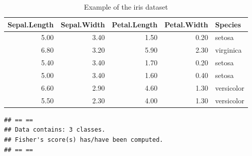 \documentclass[a4paper,conference]{IEEEtran}
\newenvironment{Shaded}{\begin{snugshade}}{\end{snugshade}}
\newcommand{\DecValTok}[1]{\textcolor[rgb]{0.00,0.00,0.81}{#1}}
\newcommand{\FunctionTok}[1]{\textcolor[rgb]{0.13,0.29,0.53}{\textbf{#1}}}
\newcommand{\NormalTok}[1]{#1}
\newcommand{\OtherTok}[1]{\textcolor[rgb]{0.56,0.35,0.01}{#1}}
\newcommand{\SpecialCharTok}[1]{\textcolor[rgb]{0.81,0.36,0.00}{\textbf{#1}}}
\begin{document}
\begin{table}[!t]
\centering
\caption{Example of the iris dataset} 
\label{tbl:iris.xtable}
\begin{tabular}{rrrrl}
  \hline
Sepal.Length & Sepal.Width & Petal.Length & Petal.Width & Species \\ 
  \hline
5.00 & 3.40 & 1.50 & 0.20 & setosa \\ 
  6.80 & 3.20 & 5.90 & 2.30 & virginica \\ 
  5.40 & 3.40 & 1.70 & 0.20 & setosa \\ 
  5.00 & 3.40 & 1.60 & 0.40 & setosa \\ 
  6.60 & 2.90 & 4.60 & 1.30 & versicolor \\ 
  5.50 & 2.30 & 4.00 & 1.30 & versicolor \\ 
   \hline
\end{tabular}
\end{table}

\begin{Shaded}
\end{Shaded}

\begin{verbatim}
## == == 
## Data contains: 3 classes.
## Fisher's score(s) has/have been computed.
## == ==
\end{verbatim}
\end{document}
